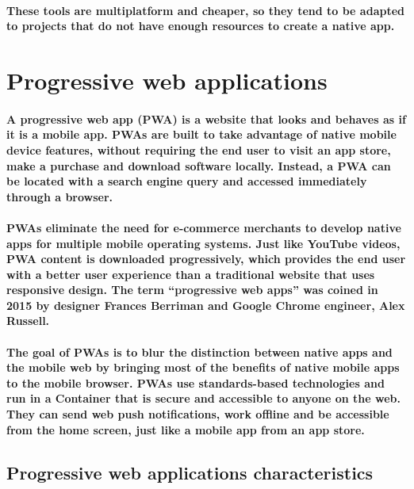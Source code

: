 \documentclass[12pt,a4paper]{article}
\begin{document}
    \paragraph{These tools are multiplatform and cheaper, so they tend to be adapted to projects that do not have enough resources to create a native app.}

    \section{Progressive web applications}

    \paragraph{A progressive web app (PWA) is a website that looks and behaves as if it is a mobile app. PWAs are built to take advantage of native mobile device features, without requiring the end user to visit an app store, make a purchase and download software locally. Instead, a PWA can be located with a search engine query and accessed immediately through a browser.}

    \paragraph{PWAs eliminate the need for e-commerce merchants to develop native apps for multiple mobile operating systems. Just like YouTube videos, PWA content is downloaded progressively, which provides the end user with a better user experience than a traditional website that uses responsive design. The term “progressive web apps” was coined in 2015 by designer Frances Berriman and Google Chrome engineer, Alex Russell.}

    \paragraph{The goal of PWAs is to blur the distinction between native apps and the mobile web by bringing most of the benefits of native mobile apps to the mobile browser. PWAs use standards-based technologies and run in a Container that is secure and accessible to anyone on the web. They can send web push notifications, work offline and be accessible from the home screen, just like a mobile app from an app store.}

    \subsection{Progressive web applications characteristics}
\end{document}
